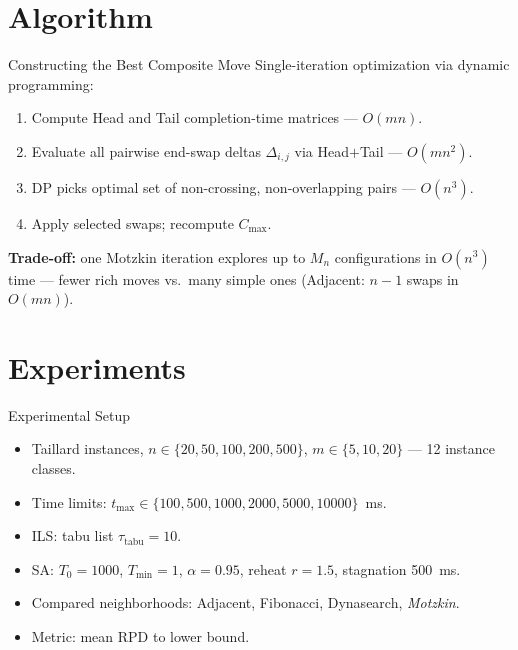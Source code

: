 \documentclass[aspectratio=169]{beamer}
\begin{document}
\section{Algorithm}
\begin{frame}{Constructing the Best Composite Move}
    Single-iteration optimization via dynamic programming:
    \begin{enumerate}
        \item Compute Head and Tail completion-time matrices --- $O(mn)$.
        \item Evaluate all pairwise end-swap deltas $\Delta_{i,j}$ via Head$+$Tail --- $O(mn^2)$.
        \item DP picks optimal set of non-crossing, non-overlapping pairs --- $O(n^3)$.
        \item Apply selected swaps; recompute $C_{\max}$.
    \end{enumerate}

    \vspace{0.3cm}
    \textbf{Trade-off:} one Motzkin iteration explores up to $M_n$ configurations in $O(n^3)$ time --- fewer rich moves vs.\ many simple ones (Adjacent: $n{-}1$ swaps in $O(mn)$).
\end{frame}

\section{Experiments}
\begin{frame}{Experimental Setup}
    \begin{itemize}
        \item Taillard instances, $n \in \{20, 50, 100, 200, 500\}$, $m \in \{5, 10, 20\}$ --- 12 instance classes.
        \item Time limits: $t_{\max} \in \{100, 500, 1000, 2000, 5000, 10000\}$~ms.
        \item ILS: tabu list $\tau_{\text{tabu}} = 10$.
        \item SA: $T_0 = 1000$, $T_{\min} = 1$, $\alpha = 0.95$, reheat $r = 1.5$, stagnation 500~ms.
        \item Compared neighborhoods: Adjacent, Fibonacci, Dynasearch, \emph{Motzkin}.
        \item Metric: mean RPD to lower bound.
    \end{itemize}
\end{frame}
\end{document}
